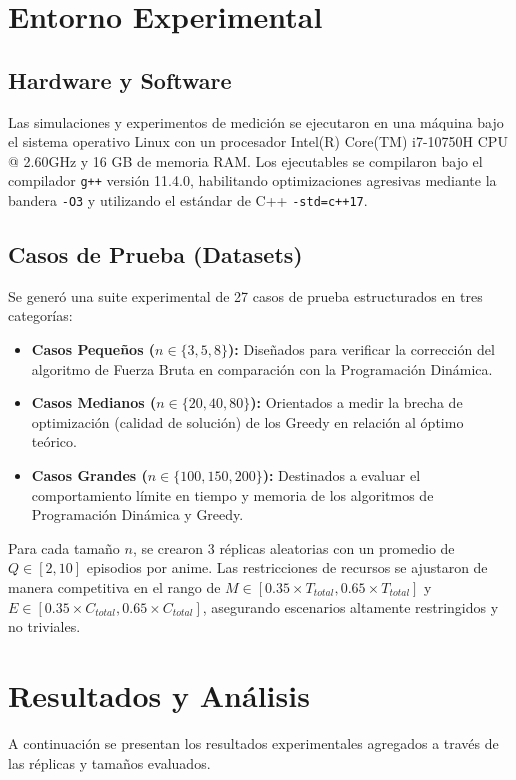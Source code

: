 \documentclass[11pt,spanish]{article} %
\begin{document}
\section{Entorno Experimental}

\subsection{Hardware y Software}
Las simulaciones y experimentos de medición se ejecutaron en una máquina bajo el sistema operativo Linux con un procesador Intel(R) Core(TM) i7-10750H CPU @ 2.60GHz y 16 GB de memoria RAM. Los ejecutables se compilaron bajo el compilador \texttt{g++} versión 11.4.0, habilitando optimizaciones agresivas mediante la bandera \texttt{-O3} y utilizando el estándar de C++ \texttt{-std=c++17}.

\subsection{Casos de Prueba (Datasets)}
Se generó una suite experimental de 27 casos de prueba estructurados en tres categorías:
\begin{itemize}
    \item \textbf{Casos Pequeños ($n \in \{3, 5, 8\}$):} Diseñados para verificar la corrección del algoritmo de Fuerza Bruta en comparación con la Programación Dinámica.
    \item \textbf{Casos Medianos ($n \in \{20, 40, 80\}$):} Orientados a medir la brecha de optimización (calidad de solución) de los Greedy en relación al óptimo teórico.
    \item \textbf{Casos Grandes ($n \in \{100, 150, 200\}$):} Destinados a evaluar el comportamiento límite en tiempo y memoria de los algoritmos de Programación Dinámica y Greedy.
\end{itemize}
Para cada tamaño $n$, se crearon 3 réplicas aleatorias con un promedio de $Q \in [2, 10]$ episodios por anime. Las restricciones de recursos se ajustaron de manera competitiva en el rango de $M \in [0.35 \times T_{total}, 0.65 \times T_{total}]$ y $E \in [0.35 \times C_{total}, 0.65 \times C_{total}]$, asegurando escenarios altamente restringidos y no triviales.

\section{Resultados y Análisis}

A continuación se presentan los resultados experimentales agregados a través de las réplicas y tamaños evaluados.
\end{document}
